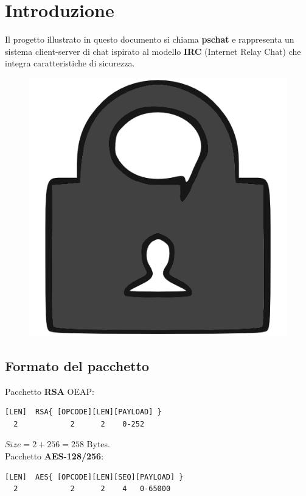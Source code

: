 \documentclass[a4paper,titlepage]{article}
\begin{document}
\section{Introduzione}  \thispagestyle{plain}
Il progetto illustrato in questo documento si chiama \textbf{pschat} e rappresenta un sistema client-server di chat ispirato al modello \textbf{IRC} (Internet Relay Chat) che integra caratteristiche di sicurezza.\\
\begin{figure}[H]
  \centering \includegraphics[scale=1.0]{../data/psc_orig.png}
\end{figure}

\subsection{Formato del pacchetto}

Pacchetto \textbf{RSA} OEAP:
\begin{verbatim}
[LEN]  RSA{ [OPCODE][LEN][PAYLOAD] }
  2            2      2    0-252
\end{verbatim}
$Size = 2 + 256= 258$ Bytes.\\

Pacchetto \textbf{AES-128/256}:
\begin{verbatim}
[LEN]  AES{ [OPCODE][LEN][SEQ][PAYLOAD] }
  2            2      2    4   0-65000
\end{verbatim}
\end{document}
